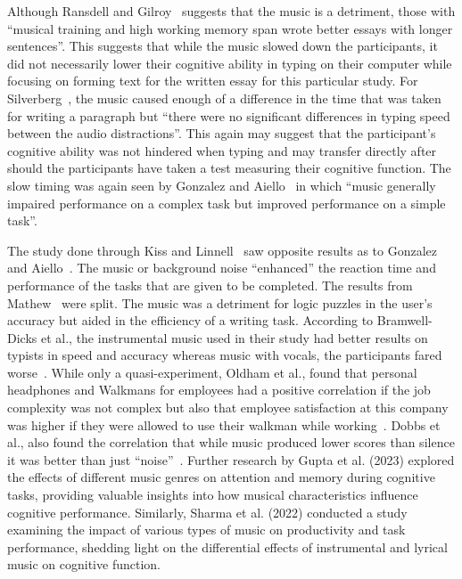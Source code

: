 \documentclass[manuscript, screen, review]{acmart} %
\begin{document}
Although Ransdell and Gilroy~\cite{ransdell2001141} suggests that the music is a detriment, those with ``musical training and high working memory span wrote better essays with longer sentences''. 
This suggests that while the music slowed down the participants, it did not necessarily lower their cognitive ability in typing on their computer while focusing on forming text for the written essay for this particular study. 
For Silverberg~\cite{AudioDistractionsAshley}, the music caused enough of a difference in the time that was taken for writing a paragraph but ``there were no significant differences in typing speed between the audio distractions''. 
This again may suggest that the participant's cognitive ability was not hindered when typing and may transfer directly after should the participants have taken a test measuring their cognitive function. 
The slow timing was again seen by Gonzalez and Aiello~\cite{Gonzalez_Aiello_2019} in which ``music generally impaired performance on a complex task but improved performance on a simple task''. 

The study done through Kiss and Linnell~\cite{kiss2021effect} saw opposite results as to Gonzalez and Aiello~\cite{Gonzalez_Aiello_2019}. The music or background noise ``enhanced'' the reaction time and performance of the tasks that are given to be completed. 
The results from Mathew~\cite{mathew2022inherently} were split. 
The music was a detriment for logic puzzles in the user's accuracy but aided in the efficiency of a writing task. 
According to Bramwell-Dicks et al., the instrumental music used in their study had better results on typists in speed and accuracy whereas music with vocals, the participants fared worse~\cite{bramwell2016can}.
While only a quasi-experiment, Oldham et al., found that personal headphones and Walkmans for employees had a positive correlation if the job complexity was not complex but also that employee satisfaction at this company was higher if they were allowed to use their walkman while working~\cite{oldhamListen}. Dobbs et al., also found the correlation that while music produced lower scores than silence it was better than just ``noise''~\cite{effectsOfBackgroundDobbs}.
Further research by \cite{gupta2023effect}Gupta et al. (2023) explored the effects of different music genres on attention and memory during cognitive tasks, providing valuable insights into how musical characteristics influence cognitive performance. Similarly, Sharma et al. \cite{sharma2022impact}(2022) conducted a study examining the impact of various types of music on productivity and task performance, shedding light on the differential effects of instrumental and lyrical music on cognitive function.
\end{document}
